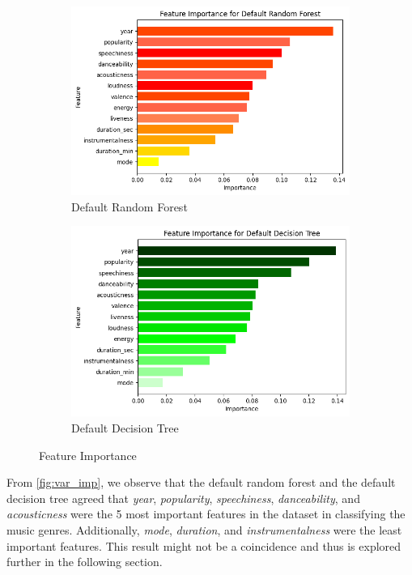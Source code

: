 \documentclass{article}
\begin{document}
\begin{figure}[htbp]
    \centering
    \begin{subfigure}[b]{0.45\textwidth}
        \centering
        \includegraphics[width=\textwidth]{rf_var_imp.png}
        \caption{Default Random Forest}
    \end{subfigure}
    \hfill
    \begin{subfigure}[b]{0.45\textwidth}
        \centering
        \includegraphics[width=\textwidth]{dt_var_imp.png}
        \caption{Default Decision Tree}
    \end{subfigure}
    \caption{Feature Importance}
    \label{fig:var_imp}
\end{figure}

From \autoref*{fig:var_imp}, we observe that the default random forest and the default decision tree agreed that \textit{year}, \textit{popularity}, \textit{speechiness}, \textit{danceability}, and \textit{acousticness} were the 5 most important features in the dataset in classifying the music genres. Additionally, \textit{mode}, \textit{duration}, and \textit{instrumentalness} were the least important features. This result might not be a coincidence and thus is explored further in the following section.
\end{document}
